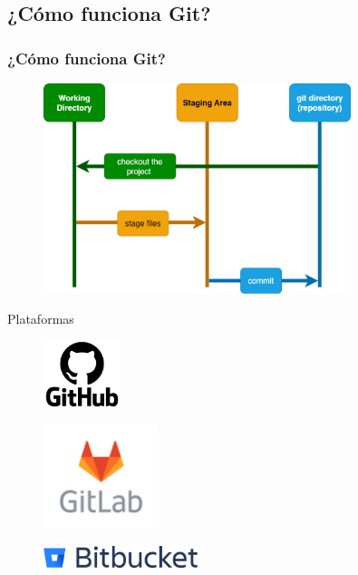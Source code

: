\documentclass{beamer}
\begin{document}
\subsection{¿Cómo funciona Git?} 

\begin{frame}
  \frametitle{¿Cómo funciona Git?} 

  \begin{figure}
    \includegraphics[width = 0.8\textwidth]{images/git-states.png}
  \end{figure}
  
\end{frame}


\begin{frame}{Plataformas} 
 
  \begin{figure}
    \includegraphics[width=0.2\textwidth]{images/logo_github.png}
  \end{figure}

  \begin{figure}
    \includegraphics[width=0.3\textwidth]{images/logo_gitlab.png}
  \end{figure}

  \begin{figure}
    \includegraphics[width=0.4\textwidth]{images/logo_Bitbucket.png}
  \end{figure}
 
\end{frame}
\end{document}
